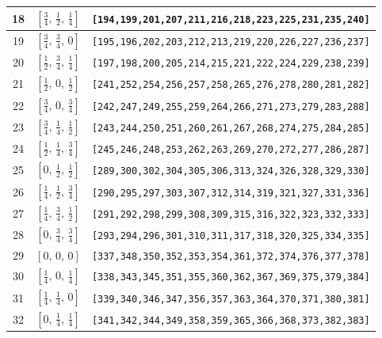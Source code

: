 \documentclass[fleqn,8pt]{jsarticle}
\begin{document}
\begin{longtable}{ccc}
18 & $\left[ \frac{3}{4},\, \frac{1}{2},\, \frac{1}{4} \right]$ & {\tt [194,199,201,207,211,216,218,223,225,231,235,240]} \\ \hline
19 & $\left[ \frac{3}{4},\, \frac{3}{4},\, 0 \right]$ & {\tt [195,196,202,203,212,213,219,220,226,227,236,237]} \\ \hline
20 & $\left[ \frac{1}{2},\, \frac{3}{4},\, \frac{1}{4} \right]$ & {\tt [197,198,200,205,214,215,221,222,224,229,238,239]} \\ \hline
21 & $\left[ \frac{1}{2},\, 0,\, \frac{1}{2} \right]$ & {\tt [241,252,254,256,257,258,265,276,278,280,281,282]} \\ \hline
22 & $\left[ \frac{3}{4},\, 0,\, \frac{3}{4} \right]$ & {\tt [242,247,249,255,259,264,266,271,273,279,283,288]} \\ \hline
23 & $\left[ \frac{3}{4},\, \frac{1}{4},\, \frac{1}{2} \right]$ & {\tt [243,244,250,251,260,261,267,268,274,275,284,285]} \\ \hline
24 & $\left[ \frac{1}{2},\, \frac{1}{4},\, \frac{3}{4} \right]$ & {\tt [245,246,248,253,262,263,269,270,272,277,286,287]} \\ \hline
25 & $\left[ 0,\, \frac{1}{2},\, \frac{1}{2} \right]$ & {\tt [289,300,302,304,305,306,313,324,326,328,329,330]} \\ \hline
26 & $\left[ \frac{1}{4},\, \frac{1}{2},\, \frac{3}{4} \right]$ & {\tt [290,295,297,303,307,312,314,319,321,327,331,336]} \\ \hline
27 & $\left[ \frac{1}{4},\, \frac{3}{4},\, \frac{1}{2} \right]$ & {\tt [291,292,298,299,308,309,315,316,322,323,332,333]} \\ \hline
28 & $\left[ 0,\, \frac{3}{4},\, \frac{3}{4} \right]$ & {\tt [293,294,296,301,310,311,317,318,320,325,334,335]} \\ \hline
29 & $\left[ 0,\, 0,\, 0 \right]$ & {\tt [337,348,350,352,353,354,361,372,374,376,377,378]} \\ \hline
30 & $\left[ \frac{1}{4},\, 0,\, \frac{1}{4} \right]$ & {\tt [338,343,345,351,355,360,362,367,369,375,379,384]} \\ \hline
31 & $\left[ \frac{1}{4},\, \frac{1}{4},\, 0 \right]$ & {\tt [339,340,346,347,356,357,363,364,370,371,380,381]} \\ \hline
32 & $\left[ 0,\, \frac{1}{4},\, \frac{1}{4} \right]$ & {\tt [341,342,344,349,358,359,365,366,368,373,382,383]} \\
\end{longtable}
\renewcommand{\arraystretch}{1.2}
\end{document}
